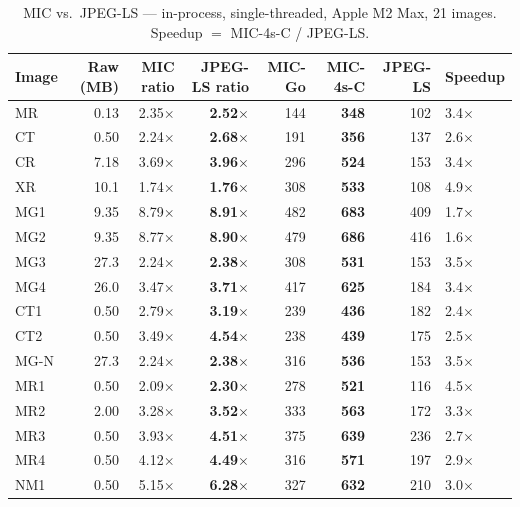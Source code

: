 \documentclass[10pt,twocolumn]{article}
\begin{document}
\begin{table}[t]
  \centering
  \caption{MIC vs.\ JPEG-LS --- in-process, single-threaded, Apple M2 Max, 21 images. Speedup $=$ MIC-4s-C / JPEG-LS.}
  \label{tab:jpegls}
  \small
  \setlength{\tabcolsep}{4pt}
  \begin{tabular}{lrrrrrrl}
    \toprule
    Image & Raw (MB) & MIC ratio & JPEG-LS ratio & MIC-Go & MIC-4s-C & JPEG-LS & Speedup \\
    \midrule
    MR  & 0.13 & 2.35$\times$ & \textbf{2.52$\times$} & 144 & \textbf{348} & 102 & 3.4$\times$ \\
    CT  & 0.50 & 2.24$\times$ & \textbf{2.68$\times$} & 191 & \textbf{356} & 137 & 2.6$\times$ \\
    CR  & 7.18 & 3.69$\times$ & \textbf{3.96$\times$} & 296 & \textbf{524} & 153 & 3.4$\times$ \\
    XR  & 10.1 & 1.74$\times$ & \textbf{1.76$\times$} & 308 & \textbf{533} & 108 & 4.9$\times$ \\
    MG1 & 9.35 & 8.79$\times$ & \textbf{8.91$\times$} & 482 & \textbf{683} & 409 & 1.7$\times$ \\
    MG2 & 9.35 & 8.77$\times$ & \textbf{8.90$\times$} & 479 & \textbf{686} & 416 & 1.6$\times$ \\
    MG3 & 27.3 & 2.24$\times$ & \textbf{2.38$\times$} & 308 & \textbf{531} & 153 & 3.5$\times$ \\
    MG4 & 26.0 & 3.47$\times$ & \textbf{3.71$\times$} & 417 & \textbf{625} & 184 & 3.4$\times$ \\
    CT1 & 0.50 & 2.79$\times$ & \textbf{3.19$\times$} & 239 & \textbf{436} & 182 & 2.4$\times$ \\
    CT2 & 0.50 & 3.49$\times$ & \textbf{4.54$\times$} & 238 & \textbf{439} & 175 & 2.5$\times$ \\
    MG-N & 27.3 & 2.24$\times$ & \textbf{2.38$\times$} & 316 & \textbf{536} & 153 & 3.5$\times$ \\
    MR1 & 0.50 & 2.09$\times$ & \textbf{2.30$\times$} & 278 & \textbf{521} & 116 & 4.5$\times$ \\
    MR2 & 2.00 & 3.28$\times$ & \textbf{3.52$\times$} & 333 & \textbf{563} & 172 & 3.3$\times$ \\
    MR3 & 0.50 & 3.93$\times$ & \textbf{4.51$\times$} & 375 & \textbf{639} & 236 & 2.7$\times$ \\
    MR4 & 0.50 & 4.12$\times$ & \textbf{4.49$\times$} & 316 & \textbf{571} & 197 & 2.9$\times$ \\
    NM1 & 0.50 & 5.15$\times$ & \textbf{6.28$\times$} & 327 & \textbf{632} & 210 & 3.0$\times$ \\

\end{tabular}
\end{table}
\end{document}
